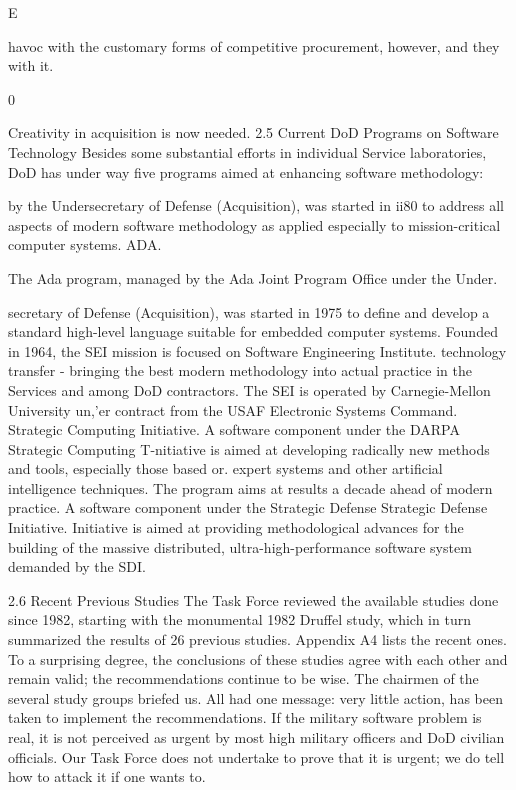 \documentclass[12pt]{article}
\begin{document}
E

havoc with the customary forms of competitive procurement, however, and they with it.

0

Creativity in acquisition is now needed.
2.5 Current DoD Programs on Software Technology
Besides some substantial efforts in individual Service laboratories, DoD has under way
five programs aimed at enhancing software methodology:

by the Undersecretary of Defense (Acquisition), was started in ii80 to address all aspects
of modern software methodology as applied especially to mission-critical computer systems.
ADA.

The Ada program, managed by the Ada Joint Program Office under the Under.

secretary of Defense (Acquisition), was started in 1975 to define and develop a standard
high-level language suitable for embedded computer systems.
Founded in 1964, the SEI mission is focused on
Software Engineering Institute.
technology transfer - bringing the best modern methodology into actual practice in the
Services and among DoD contractors. The SEI is operated by Carnegie-Mellon University
un,'er contract from the USAF Electronic Systems Command.
Strategic Computing Initiative. A software component under the DARPA Strategic
Computing T-nitiative is aimed at developing radically new methods and tools, especially
those based or. expert systems and other artificial intelligence techniques. The program
aims at results a decade ahead of modern practice.
A software component under the Strategic Defense
Strategic Defense Initiative.
Initiative is aimed at providing methodological advances for the building of the massive
distributed, ultra-high-performance software system demanded by the SDI.

2.6 Recent Previous Studies
The Task Force reviewed the available studies done since 1982, starting with the
monumental 1982 Druffel study, which in turn summarized the results of 26 previous
studies. Appendix A4 lists the recent ones.
To a surprising degree, the conclusions of these studies agree with each other and
remain valid; the recommendations continue to be wise. The chairmen of the several study
groups briefed us. All had one message: very little action, has been taken to implement the
recommendations. If the military software problem is real, it is not perceived as urgent by
most high military officers and DoD civilian officials. Our Task Force does not undertake
to prove that it is urgent; we do tell how to attack it if one wants to.
\end{document}
